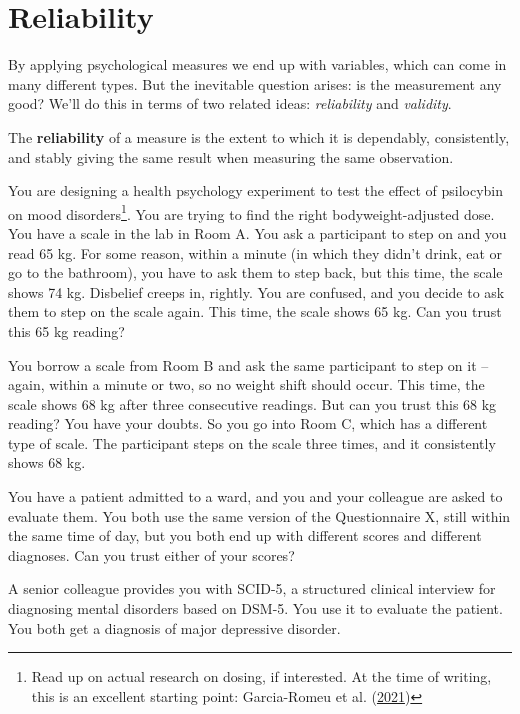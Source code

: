 \documentclass[
  11pt,
  a4paper,
  twoside,symmetric,openright]{book}
\theoremstyle{break}
\theoremstyle{break}
\begin{document}
\hypertarget{reliability}{%
\section{Reliability}\label{reliability}}

By applying psychological measures we end up with variables, which can come in many different types. But the inevitable question arises: is the measurement any good? We'll do this in terms of two related ideas: \emph{reliability} and \emph{validity}.

\begin{definition}[Reliability]
\protect\hypertarget{def:defreliability}{}\label{def:defreliability}The \textbf{reliability} of a measure is the extent to which it is dependably, consistently, and stably giving the same result when measuring the same observation.
\end{definition}

\begin{example}
\protect\hypertarget{exm:exreliability1}{}\label{exm:exreliability1}You are designing a health psychology experiment to test the effect of psilocybin on mood disorders\footnote{Read up on actual research on dosing, if interested. At the time of writing, this is an excellent starting point: Garcia-Romeu et al. (\protect\hyperlink{ref-garcia-romeuOptimalDosingPsilocybin2021}{2021})}. You are trying to find the right bodyweight-adjusted dose. You have a scale in the lab in Room A. You ask a participant to step on and you read 65 kg. For some reason, within a minute (in which they didn't drink, eat or go to the bathroom), you have to ask them to step back, but this time, the scale shows 74 kg. Disbelief creeps in, rightly. You are confused, and you decide to ask them to step on the scale again. This time, the scale shows 65 kg. Can you trust this 65 kg reading?

You borrow a scale from Room B and ask the same participant to step on it -- again, within a minute or two, so no weight shift should occur. This time, the scale shows 68 kg after three consecutive readings. But can you trust this 68 kg reading? You have your doubts. So you go into Room C, which has a different type of scale. The participant steps on the scale three times, and it consistently shows 68 kg.
\end{example}

\begin{example}
\protect\hypertarget{exm:exreliability2}{}\label{exm:exreliability2}You have a patient admitted to a ward, and you and your colleague are asked to evaluate them. You both use the same version of the Questionnaire X, still within the same time of day, but you both end up with different scores and different diagnoses. Can you trust either of your scores?

A senior colleague provides you with SCID-5, a structured clinical interview for diagnosing mental disorders based on DSM-5. You use it to evaluate the patient. You both get a diagnosis of major depressive disorder.
\end{example}
\end{document}
